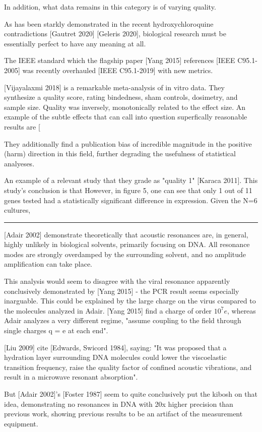 \documentclass[paper.tex]{subfiles}
\begin{document}
\begin{multicols}{1}
In addition, what data remains in this category is of varying quality. 

As has been starkly demonstrated in the recent hydroxychloroquine contradictions [Gautret 2020] [Geleris 2020], biological research must be essentially perfect to have any meaning at all.


The IEEE standard which the flagship paper [Yang 2015] references [IEEE C95.1-2005] was recently overhauled [IEEE C95.1-2019] with new metrics.


[Vijayalaxmi 2018] is a remarkable meta-analysis of in vitro data. They synthesize a quality score, rating bindedness, sham controls, dosimetry, and sample size. Quality was inversely, monotonically related to the effect size. An example of the subtle effects that can call into question superfically reasonable results are [

They additionally find a publication bias of incredible magnitude in the positive (harm) direction in this field, further degrading the usefulness of statistical analyeses.

An example of a relevant study that they grade as "quality 1" [Karaca 2011]. This study's conclusion is that However, in figure 5, one can see that only 1 out of 11 genes tested had a statistically significant difference in expression. Given the N=6 cultures, 

\rule{\linewidth}{0.2pt}

[Adair 2002] demonstrate theoretically that acoustic resonances are, in general, highly unlikely in biological solvents, primarily focusing on DNA. All resonance modes are strongly overdamped by the surrounding solvent, and no amplitude amplification can take place.

This analysis would seem to disagree with the viral resonance apparently conclusively demonstrated by [Yang 2015] - the PCR result seems especially inarguable. This could be explained by the large charge on the virus compared to the molecules analyzed in Adair. [Yang 2015] find a charge of order $10^7 e$, whereas Adair analyzes a very different regime, "assume coupling to the field through single charges q = e at each end".

[Liu 2009] cite [Edwards, Swicord 1984], saying: "It was proposed that a hydration layer surrounding DNA molecules could lower the viscoelastic transition
frequency, raise the quality factor of confined acoustic vibrations, and result in a microwave resonant absorption". 

But [Adair 2002]'s [Foster 1987] seem to quite conclusively put the kibosh on that idea, demonstrating no resonances in DNA with 20x higher precision than previous work, showing previous results to be an artifact of the measurement equipment.


\end{multicols}
\end{document}
